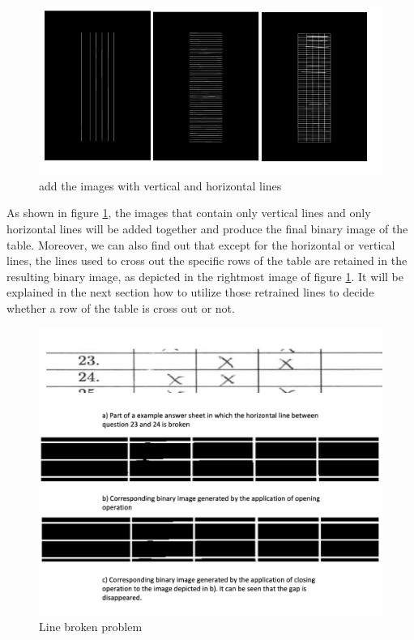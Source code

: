 \documentclass[a4paper,twoside]{article}
\begin{document}
\begin{figure}[!h]
  \centering
  \includegraphics[width=\columnwidth]{Latex/imgs/addweight.PNG}
  \caption{add the images with vertical and horizontal lines }
  \label{fig:final table}
 \end{figure}
As shown in figure \ref{fig:final table}, the images that contain only vertical lines and only  horizontal lines will be added together and produce the final binary image of the table. Moreover, we can also find out that except for the horizontal or vertical lines, the lines used to cross out the specific rows of the table are retained in the resulting binary image, as depicted in the rightmost image of figure \ref{fig:final table}. It will be explained in the next section how to utilize those retrained lines to decide whether a row of the table is cross out or not. \\ 
 \begin{figure}[!h]
  \centering
  \includegraphics[width=\columnwidth]{Latex/imgs/sheet34.png}
  \caption{Line broken problem}
  \label{fig:sheet34}
 \end{figure}
\end{document}
